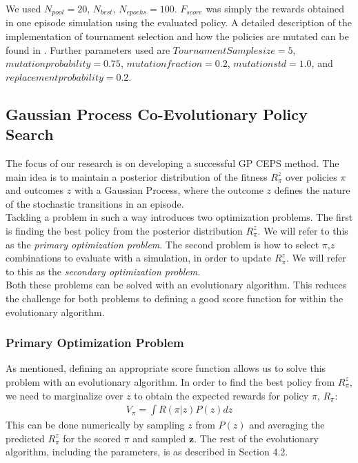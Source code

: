 We used $N_{pool} = 20$, $N_{best}$, $N_{epochs} = 100$. $F_{score}$ was simply the rewards obtained in one episode simulation using the evaluated policy.  
A detailed description of the implementation of tournament selection and how the policies are mutated can be found in \cite{koppejan2011neuroevolutionary}. Further parameters used are $Tournament Samplesize = 5$, $mutation probability = 0.75$, $mutation fraction = 0.2$, $mutation std = 1.0$, and $replacement probability = 0.2$. 

\subsection{Gaussian Process Co-Evolutionary Policy Search}

The focus of our research is on developing a successful GP CEPS method. The main idea is to maintain a posterior distribution of the fitness $R_{\pi}^z$ over policies $\pi$ and outcomes $z$ 
with a Gaussian Process, where the outcome $z$ defines the nature of the stochastic transitions in an episode. \\
Tackling a problem in such a way introduces two optimization problems. The first is finding the best policy from the posterior distribution $R_{\pi}^z$. We will refer to this as the \textit{primary optimization problem}. The second problem is how to select $\pi$,$z$ combinations to evaluate with a simulation, in order to update $R_{\pi}^z$. We will refer to this as the \textit{secondary optimization problem}. \\
Both these problems can be solved with an evolutionary algorithm. This reduces the challenge for both problems to defining a good score function for within the evolutionary algorithm.

\subsubsection{Primary Optimization Problem}

As mentioned, defining an appropriate score function allows us to solve this problem with an evolutionary algorithm. In order to find the best policy from $R_{\pi}^z$, we need to marginalize over $z$ to obtain the expected rewards for policy $\pi$, $R_{\pi}$: 
\begin{align}
V_{\pi} = \int R(\pi | z) P(z)dz 
\end{align}
This can be done numerically by sampling $z$ from $P(z)$ and averaging the predicted $R_{\pi}^z$ for the scored $\pi$ and sampled $\mathbf{z}$. The rest of the evolutionary algorithm, including the parameters, is as described in Section 4.2.

